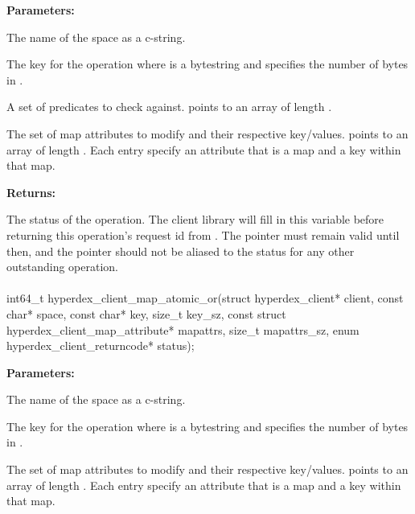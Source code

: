 \noindent\textbf{Parameters:}
\begin{description}[labelindent=\widthof{{\code{mapattrs}, \code{mapattrs\_sz}}},leftmargin=*,noitemsep,nolistsep,align=right]
\item[\code{space}] The name of the space as a c-string.
\item[\code{key}, \code{key\_sz}] The key for the operation where  is a bytestring and  specifies the number of bytes in .
\item[\code{checks}, \code{checks\_sz}] A set of predicates to check against.   points to an array of length .
\item[\code{mapattrs}, \code{mapattrs\_sz}] The set of map attributes to modify and their respective key/values.   points to an array of length .  Each entry specify an attribute that is a map and a key within that map.
\end{description}

\noindent\textbf{Returns:}
\begin{description}[labelindent=\widthof{{\code{status}}},leftmargin=*,noitemsep,nolistsep,align=right]
\item[\code{status}] The status of the operation.  The client library will fill in this variable before returning this operation's request id from .  The pointer must remain valid until then, and the pointer should not be aliased to the status for any other outstanding operation.
\end{description}

\paragraph{}
\label{api:c:map_atomic_or}
\begin{ccode}
int64_t hyperdex_client_map_atomic_or(struct hyperdex_client* client,
                const char* space,
                const char* key, size_t key_sz,
                const struct hyperdex_client_map_attribute* mapattrs, size_t mapattrs_sz,
                enum hyperdex_client_returncode* status);
\end{ccode}
\funcdesc 

\noindent\textbf{Parameters:}
\begin{description}[labelindent=\widthof{{\code{mapattrs}, \code{mapattrs\_sz}}},leftmargin=*,noitemsep,nolistsep,align=right]
\item[\code{space}] The name of the space as a c-string.
\item[\code{key}, \code{key\_sz}] The key for the operation where  is a bytestring and  specifies the number of bytes in .
\item[\code{mapattrs}, \code{mapattrs\_sz}] The set of map attributes to modify and their respective key/values.   points to an array of length .  Each entry specify an attribute that is a map and a key within that map.
\end{description}

